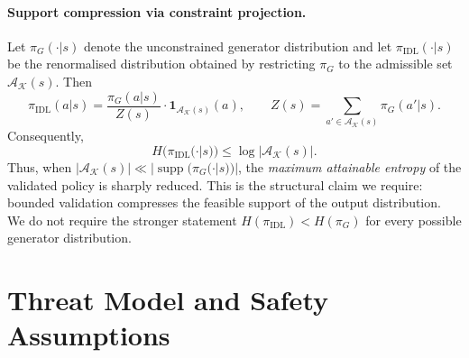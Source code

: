 \documentclass[11pt,a4paper]{article}
\begin{document}
\paragraph{Support compression via constraint projection.}
Let $\pi_{G}(\cdot|s)$ denote the unconstrained generator distribution and let $\pi_{\text{IDL}}(\cdot|s)$ be the renormalised distribution obtained by restricting $\pi_G$ to the admissible set $\mathcal{A}_{\mathcal{K}}(s)$. Then
\begin{equation}
  \pi_{\text{IDL}}(a|s) = \frac{\pi_G(a|s)}{Z(s)} \cdot \mathbf{1}_{\mathcal{A}_{\mathcal{K}}(s)}(a),
  \qquad
  Z(s) = \sum_{a' \in \mathcal{A}_{\mathcal{K}}(s)} \pi_G(a'|s).
\label{eq:idl_distribution}
\end{equation}
Consequently,
\[
H(\pi_{\text{IDL}}(\cdot|s)) \le \log |\mathcal{A}_{\mathcal{K}}(s)|.
\]
Thus, when $|\mathcal{A}_{\mathcal{K}}(s)| \ll |\operatorname{supp}(\pi_G(\cdot|s))|$, the \textit{maximum attainable entropy} of the validated policy is sharply reduced. This is the structural claim we require: bounded validation compresses the feasible support of the output distribution. We do not require the stronger statement $H(\pi_{\text{IDL}})<H(\pi_G)$ for every possible generator distribution.

\section{Threat Model and Safety Assumptions}
\end{document}
